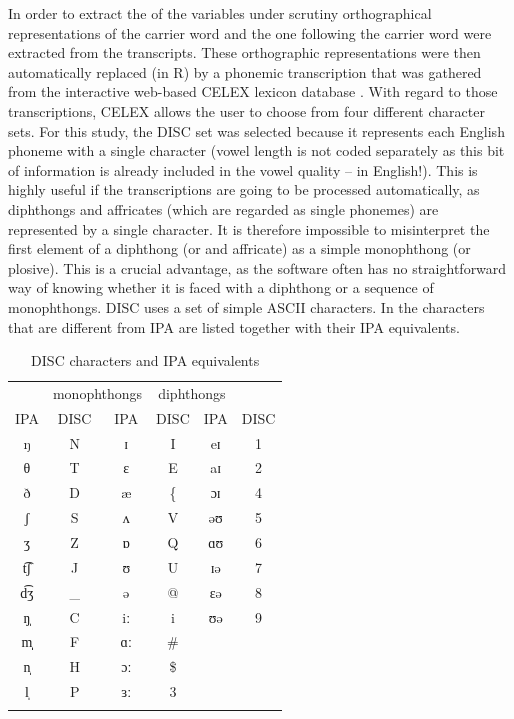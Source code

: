In order to extract the  of the variables under scrutiny orthographical representations of the carrier word and the one following the carrier word were extracted from the transcripts.
These orthographic representations were then automatically replaced (in R) by a phonemic transcription that was gathered from the interactive web-based CELEX lexicon database \parencite{baayenetal1993}.
With regard to those transcriptions, CELEX allows the user to choose from four different character sets.
For this study, the DISC set was selected because it represents each English phoneme with a single character (vowel length is not coded separately as this bit of information is already included in the vowel quality -- in English!).
This is highly useful if the transcriptions are going to be processed automatically, as diphthongs and affricates (which are regarded as single phonemes) are represented by a single character.
It is therefore impossible to misinterpret the first element of a diphthong (or and affricate) as a simple monophthong (or plosive).
This is a crucial advantage, as the software often has no straightforward way of knowing whether it is faced with a diphthong or a sequence of monophthongs.
DISC uses a set of simple ASCII characters.
In  the characters that are different from IPA are listed together with their IPA equivalents.

	\begin{table}
		
		\caption{DISC characters and IPA equivalents}
		\begin{tabular}{cccccc}
			\lsptoprule
			\multicolumn{2}{c}{consonants} & \multicolumn{2}{c}{monophthongs} & \multicolumn{2}{c}{diphthongs}\\
			IPA & DISC & IPA & DISC & IPA & DISC\\
			\midrule
			ŋ & N & ɪ & I & eɪ & 1\\
			θ & T & ɛ & E & aɪ & 2\\
			ð & D & æ & \{ & ɔɪ & 4\\
			ʃ & S & ʌ & V & əʊ & 5\\
			ʒ & Z & ɒ & Q & ɑʊ & 6\\
			t͡ʃ & J & ʊ & U & ɪə & 7\\
			d͡ʒ & \_ & ə & @ & ɛə & 8\\
			ŋ̩ & C & iː & i & ʊə & 9\\
			m̩̩ & F & ɑː & \# &&\\
			n̩ & H & ɔː & \$ &&\\
			l̩ & P & ɜː & 3 &&\\
			\lspbottomrule
		\end{tabular}
		\label{tab.DISC}
	\end{table}

